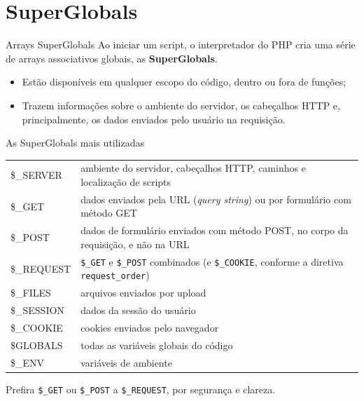 \documentclass{beamer}
\begin{document}
\section{SuperGlobals}

\begin{frame}{Arrays SuperGlobals}
	Ao iniciar um script, o interpretador do PHP cria uma série de arrays
	associativos globais, as \textbf{SuperGlobals}.

	\vspace{0.2cm}
	\begin{itemize}
		\item Estão disponíveis em qualquer escopo do código, dentro ou fora de
		      funções;
		\item Trazem informações sobre o ambiente do servidor, os cabeçalhos HTTP
		      e, principalmente, os dados enviados pelo usuário na requisição.
	\end{itemize}
\end{frame}

\begin{frame}{As SuperGlobals mais utilizadas}
	\small
	\begin{tabular}{>{\ttfamily}l p{}}
		\toprule
		\$\_SERVER  & ambiente do servidor, cabeçalhos HTTP, caminhos e
		localização de scripts \\
		\$\_GET     & dados enviados pela URL (\emph{query string}) ou por
		formulário com método GET \\
		\$\_POST    & dados de formulário enviados com método POST, no corpo da
		requisição, e não na URL \\
		\$\_REQUEST & \texttt{\$\_GET} e \texttt{\$\_POST} combinados (e
		\texttt{\$\_COOKIE}, conforme a diretiva \texttt{request\_order}) \\
		\$\_FILES   & arquivos enviados por upload \\
		\$\_SESSION & dados da sessão do usuário \\
		\$\_COOKIE  & cookies enviados pelo navegador \\
		\$GLOBALS   & todas as variáveis globais do código \\
		\$\_ENV     & variáveis de ambiente \\
		\bottomrule
	\end{tabular}

	\vspace{0.2cm}
	Prefira \texttt{\$\_GET} ou \texttt{\$\_POST} a \texttt{\$\_REQUEST}, por
	segurança e clareza.
\end{frame}
\end{document}
